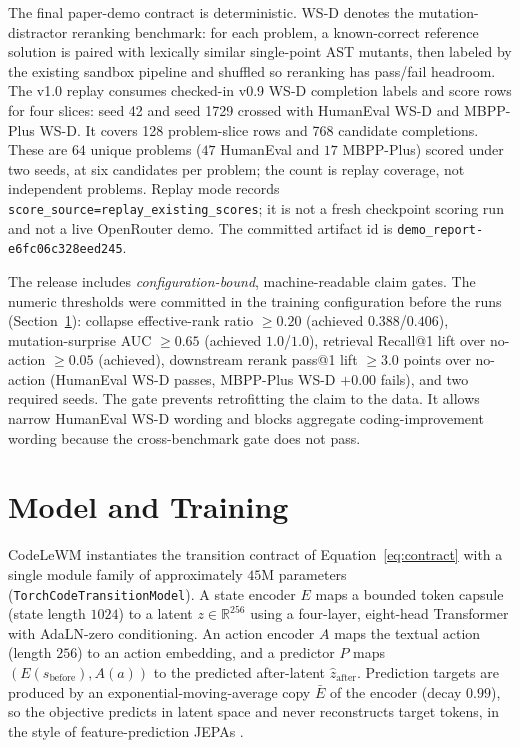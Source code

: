 \documentclass[11pt]{article}
\newcommand{\code}[1]{\texttt{#1}}
\newcommand{\modelname}{CodeLeWM}
\begin{document}
The final paper-demo contract is deterministic. WS-D denotes the
mutation-distractor reranking benchmark: for each problem, a known-correct
reference solution is paired with lexically similar single-point AST mutants,
then labeled by the existing sandbox pipeline and shuffled so reranking has
pass/fail headroom. The v1.0 replay consumes checked-in v0.9 WS-D completion
labels and score rows for four slices: seed 42 and seed 1729 crossed with
HumanEval WS-D and MBPP-Plus WS-D. It covers 128 problem-slice rows and 768
candidate completions. These are $64$ unique problems ($47$ HumanEval and $17$
MBPP-Plus) scored under two seeds, at six candidates per problem; the count is
replay coverage, not independent problems. Replay mode records
\code{score\_source=replay\_existing\_scores}; it is not a fresh checkpoint
scoring run and not a live OpenRouter demo. The committed artifact id is
\code{demo\_report-e6fc06c328eed245}.

The release includes \emph{configuration-bound}, machine-readable claim gates.
The numeric thresholds were committed in the training configuration before the
runs (Section~\ref{sec:model}): collapse effective-rank ratio $\geq 0.20$
(achieved $0.388$/$0.406$), mutation-surprise AUC $\geq 0.65$ (achieved
$1.0$/$1.0$), retrieval Recall@1 lift over no-action $\geq 0.05$ (achieved),
downstream rerank pass@1 lift $\geq 3.0$ points over no-action (HumanEval WS-D
passes, MBPP-Plus WS-D $+0.00$ fails), and two required seeds. The gate prevents
retrofitting the claim to the data. It allows narrow HumanEval WS-D wording and
blocks aggregate coding-improvement wording because the cross-benchmark gate
does not pass.

\section{Model and Training}
\label{sec:model}

\modelname{} instantiates the transition contract of Equation~\eqref{eq:contract}
with a single module family of approximately $45$M parameters
(\code{TorchCodeTransitionModel}). A state encoder $E$ maps a bounded token
capsule (state length $1024$) to a latent $z \in \mathbb{R}^{256}$ using a
four-layer, eight-head Transformer with AdaLN-zero conditioning. An action
encoder $A$ maps the textual action (length $256$) to an action embedding, and a
predictor $P$ maps $(E(s_{\mathrm{before}}), A(a))$ to the predicted after-latent
$\hat z_{\mathrm{after}}$. Prediction targets are produced by an
exponential-moving-average copy $\bar E$ of the encoder (decay $0.99$), so the
objective predicts in latent space and never reconstructs target tokens, in the
style of feature-prediction JEPAs
\citep{assran2023selfsupervisedlearningimagesjointembedding,bardes2024revisitingfeaturepredictionlearning}.
\end{document}

